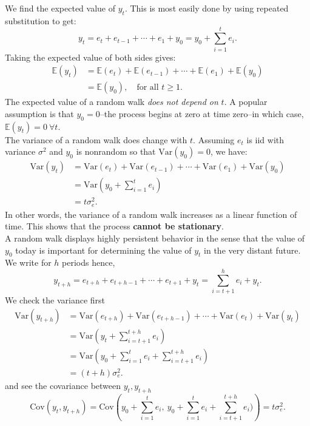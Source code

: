 \documentclass[a4paper, 10pt]{article}
\theoremstyle{definition}	%
\begin{document}
We find the expected value of \( y_t \). This is most easily done by using repeated substitution to get:
\[
y_t = e_t + e_{t-1} + \cdots + e_1 + y_0 = y_0 + \sum_{i=1}^t e_i.
\]
Taking the expected value of both sides gives:
\begin{align*}
    \mathbb{E}(y_t) &= \mathbb{E}(e_t) + \mathbb{E}(e_{t-1}) + \cdots + \mathbb{E}(e_1) + \mathbb{E}(y_0) \\
    &= \mathbb{E}(y_0), \quad \text{for all } t \ge 1.
\end{align*}
The expected value of a random walk \textit{does not depend on } \( t \).
A popular assumption is that $y_0 = 0$--the process begins at zero at time zero--in which case, $\mathbb{E}(y_t) = 0\ \forall t$.\\
The variance of a random walk does change with \( t \). Assuming \( e_t \) is iid with variance \( \sigma^2 \) and $y_0$ is nonrandom so that $\mathrm{Var}(y_0) = 0$, we have:
\begin{align*}
    \text{Var}(y_t) &= \text{Var}(e_t) + \text{Var}(e_{t-1}) + \cdots + \text{Var}(e_1) + \mathrm{Var}(y_0)\\ 
    &= \mathrm{Var}\left(y_0 + \sum_{i=1}^t e_i\right)\\
    &= t \sigma_e^2.
    \label{eq:11.21}
\end{align*}
In other words, the variance of a random walk increases as a linear function of time. This shows that the process \textbf{cannot be stationary}.\\
A random walk displays highly persistent behavior in the sense that the value of \( y_0 \) today is important for determining the value of \( y_t \) in the very distant future. We write for $h$ periods hence, 
\[
y_{t+h} = e_{t+h} + e_{t+h-1} + \cdots + e_{t+1} + y_t = \sum_{i=t+1}^h e_{i} + y_t.
\]
We check the variance first
\begin{align*}
    \text{Var}(y_{t+h}) &= \text{Var}(e_{t+h}) + \text{Var}(e_{t+h-1}) + \cdots + \text{Var}(e_t) + \mathrm{Var}(y_t)\\ 
    &= \mathrm{Var}\left(y_t + \sum_{i=t+1}^{t+h} e_i\right)\\
    &= \mathrm{Var}\left(y_0 + \sum_{i=1}^t e_i + \sum_{i=t+1}^{t+h} e_i\right)\\
    &= (t+h) \sigma_e^2.
\end{align*}
and see the covariance between $y_t, y_{t+h}$
\begin{equation*}
    \mathrm{Cov}(y_t, y_{t+h}) = \mathrm{Cov}\left(y_0 + \sum_{i=1}^t e_i,\ y_0 + \sum_{i=1}^t e_i + \sum_{i=t+1}^{t+h} e_i)\right) = t\sigma_e^2.
\end{equation*}
\end{document}
